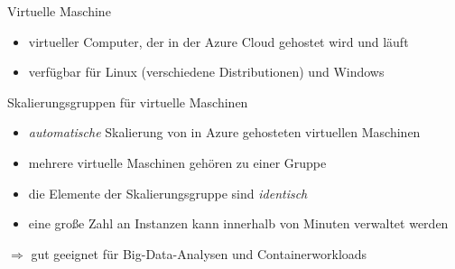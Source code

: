 
\begin{flashcard}[Definition]{Virtuelle Maschine}
    \begin{itemize}
        \item virtueller Computer, der in der Azure Cloud gehostet wird und läuft
        \item verfügbar für Linux (verschiedene Distributionen) und Windows
    \end{itemize}
\end{flashcard}

\begin{flashcard}[Definition]{Skalierungsgruppen für virtuelle Maschinen}
    \begin{itemize}
        \item \emph{automatische} Skalierung von in Azure gehosteten virtuellen Maschinen
        \item mehrere virtuelle Maschinen gehören zu einer Gruppe
        \item die Elemente der Skalierungsgruppe sind \emph{identisch}
        \item eine große Zahl an Instanzen kann innerhalb von Minuten verwaltet werden
    \end{itemize}
    $\Rightarrow$ gut geeignet für Big-Data-Analysen und Containerworkloads

\end{flashcard}

